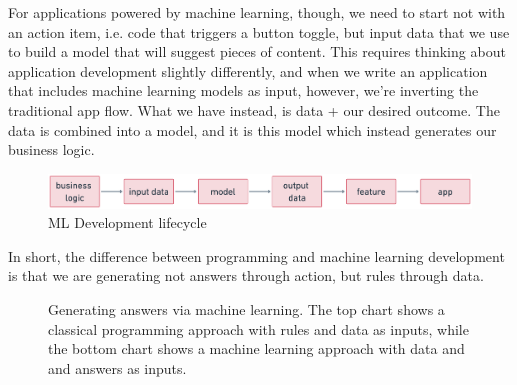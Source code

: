 \documentclass[11pt]{diazessay} %
\begin{document}
For applications powered by machine learning, though, we need to start not with an action item, i.e. code that triggers a button toggle, but input data that we use to build a model that will suggest pieces of content. This requires thinking about application development slightly differently, and when we write an application that includes machine learning models as input, however, we’re inverting the traditional app flow. What we have instead, is data + our desired outcome. The data is combined into a model, and it is this model which instead generates our business logic. 

\begin{figure}[!ht]
\centering
\includegraphics[width=.75\textwidth]{figures/ml_flow.png}
\caption{ML Development lifecycle}
\end{figure}

In short, the difference between programming and machine learning development is that we are generating not answers through action, but rules through data.

\begin{figure}[H]
\centering
{}
\caption{Generating answers via machine learning. The top chart shows a classical programming approach with rules and data as inputs, while the bottom chart shows a machine learning approach with data and and answers as inputs. \citep{chollet2021deep}}
\end{figure}
\end{document}

